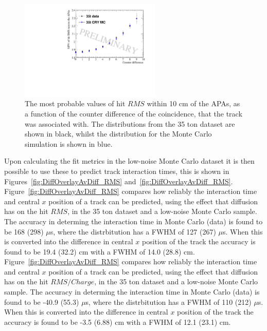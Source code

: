 \begin{figure}[h!]
  \centering
  \includegraphics[width=0.6\textwidth]{InterceptCanvasOverlay}
  \caption[The angular dependence of diffusion in the 35 ton dataset and Monte Carlo for hits within 10 cm of the APAs]
          {The most probable values of hit $RMS$ within 10 cm of the APAs, as a function of the counter difference of the coincidence, that the track was associated with. The distributions from the 35 ton dataset are shown in black, whilst the distribution for the Monte Carlo simulation is shown in blue.}
  \label{fig:DiffMCDataCompInt}
\end{figure}

Upon calculating the fit metrics in the low-noise Monte Carlo dataset it is then possible to use these to predict track interaction times, this is shown in Figures~\ref{fig:DiffOverlayAvDiff_RMS} and~\ref{fig:DiffOverlayAvDiff_RMS}. Figure~\ref{fig:DiffOverlayAvDiff_RMS} compares how reliably the interaction time and central $x$ position of a track can be predicted, using the effect that diffusion has on the hit $RMS$, in the 35 ton dataset and a low-noise Monte Carlo sample. The accuracy in determing the interaction time in Monte Carlo (data) is found to be 168 (298) $\mu$s, where the distrbitution has a FWHM of 127 (267) $\mu$s. When this is converted into the difference in central $x$ position of the track the accuracy is found to be 19.4 (32.2) cm with a FWHM of 14.0 (28.8) cm. Figure~\ref{fig:DiffOverlayAvDiff_RMS} compares how reliably the interaction time and central $x$ position of a track can be predicted, using the effect that diffusion has on the hit $RMS/Charge$, in the 35 ton dataset and a low-noise Monte Carlo sample. The accuracy in determing the interaction time in Monte Carlo (data) is found to be -40.9 (55.3) $\mu$s, where the distrbitution has a FWHM of 110 (212) $\mu$s. When this is converted into the difference in central $x$ position of the track the accuracy is found to be -3.5 (6.88) cm with a FWHM of 12.1 (23.1) cm. \\

